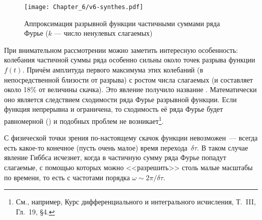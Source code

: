 \begin{figure}[h!]
    \hfill\texttt{[image: Chapter\_6/v6-synthes.pdf]}
    \caption{Аппроксимация разрывной функции частичными суммами ряда Фурье
        ($k$ --- число ненулевых слагаемых)}
\end{figure}

При внимательном рассмотрении можно заметить интересную особенность:
колебания частичной суммы ряда особенно сильны около точек разрыва
функции $f(t)$. Причём
амплитуда первого максимума этих колебаний (в непосредственной близости от
разрыва)  с ростом числа слагаемых (и составляет около 18\%
от величины скачка). Это явление получило название .
Математически оно является следствием  сходимости ряда
Фурье разрывной функции. Если функция непрерывна и ограничена, то сходимость
её ряда Фурье будет равномерной () и подобных проблем
не возникает\footnote{См., например,
 Курс дифференциального и интегрального исчисления,
Т.~III, Гл.~19, \S4.}.


С физической точки зрения по-настоящему  скачок функции
невозможен~--- всегда есть какое-то конечное (пусть очень малое) время
перехода~$\delta\tau$. В таком случае явление Гиббса исчезнет, когда в
частичную сумму ряда Фурье попадут слагаемые, с помощью которых можно
<<разрешить>> столь малые масштабы по времени, то есть с частотами
порядка $\omega \sim 2\pi /\delta \tau$.

